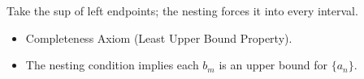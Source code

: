 \begin{remark*}
Take the sup of left endpoints; the nesting forces it into every interval.
\end{remark*}

\begin{remark*}[Dependencies]
\begin{itemize}
  \item Completeness Axiom (Least Upper Bound Property).
  \item The nesting condition implies each $b_m$ is an upper bound for
        $\{a_n\}$.
\end{itemize}
\end{remark*}
